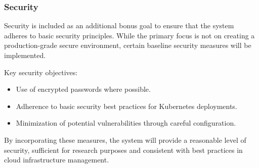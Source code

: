 \subsubsection{Security}

Security is included as an additional bonus goal to ensure that the system adheres to basic security principles. While the primary focus is not on creating a production-grade secure environment, certain baseline security measures will be implemented.

Key security objectives:
\begin{itemize}
\item Use of encrypted passwords where possible.
\item Adherence to basic security best practices for Kubernetes deployments.
\item Minimization of potential vulnerabilities through careful configuration.
\end{itemize}
By incorporating these measures, the system will provide a reasonable level of security, sufficient for research purposes and consistent with best practices in cloud infrastructure management.

 